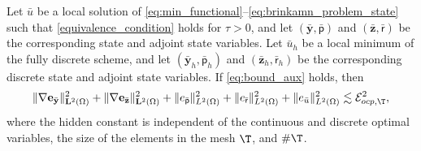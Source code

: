 \documentclass[final]{siamart0216}
\begin{document}
\begin{theorem}
\label{global_reliability_fully} 
Let $\bar{u}$ be a local solution of \eqref{eq:min_functional}--\eqref{eq:brinkamn_problem_state} such that \eqref{equivalence_condition} holds for $\tau > 0$, and let 
$(\bar{\mathbf{y}},\bar{\mathsf{p}})$ and $(\bar{\mathbf{z}},\bar{\mathsf{r}})$ be the corresponding state and adjoint state variables. Let $\bar{u}_{h}$ be a local minimum of the fully discrete scheme, and let $(\bar{\mathbf{y}}_h,\bar{\mathsf{p}}_h)$ and $(\bar{\mathbf{z}}_h,\bar{\mathsf{r}}_h)$ be the corresponding discrete state and adjoint state variables. If \eqref{eq:bound_aux} holds, then
\begin{align}\label{eq:estimates_global_reliability}
\|\nabla \mathbf{e}_{\bar{\mathbf{y}}} \|_{\mathbf{L}^2(\Omega)}^2
+
\|\nabla \mathbf{e}_{\bar{\mathbf{z}}} \|_{\mathbf{L}^2(\Omega)}^2
+
\| e_{\bar{\mathsf{p}}} \|_{L^2(\Omega)}^2
+
\| e_{\bar{\mathsf{r}}} \|_{L^2(\Omega)}^2 
+
\|e_{\bar{u}}\|_{L^2(\Omega)}^2
\lesssim \mathcal{E}_{ocp,\T}^2,
\end{align}
where the hidden constant is independent of the continuous and discrete optimal variables, the size of the elements in the mesh $\T$, and $\#\T$.
\end{theorem}
\end{document}
